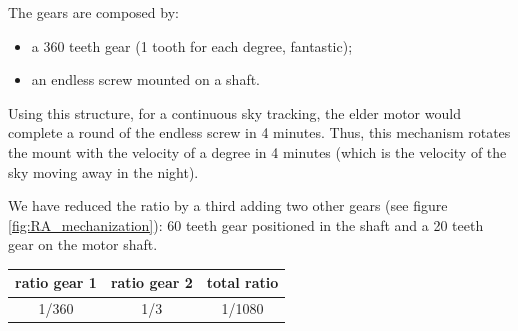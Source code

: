 \documentclass{article}
\begin{document}
\begin{multicols}{2}
        The gears are composed by:
        \begin{itemize}
            \item a 360 teeth gear (1 tooth for each degree, fantastic);
            \item an endless screw mounted on a shaft.
        \end{itemize}
        Using this structure, for a continuous sky tracking, the elder motor would complete a round of the endless screw in 4 minutes.
        Thus, this mechanism rotates the mount with the velocity of a degree in 4 minutes (which is the velocity of the sky moving away in the night).

        We have reduced the ratio by a third adding two other gears (see figure \ref{fig:RA_mechanization}): 60 teeth gear positioned in the shaft and a 20 teeth gear on the motor shaft.
        \\
        \begin{minipage}{.5\textwidth}
            \centering
            \begin{tabular}{cc|c}
                ratio gear 1 & ratio gear 2 & total ratio \\
                \hline
                1/360 & 1/3 & 1/1080 \\
                \hline
            \end{tabular}
            \label{tab:RA_mechanization}
        \end{minipage}
        \\
        \begin{minipage}{.5\textwidth}
            \centering

\end{minipage}
\end{multicols}
\end{document}
